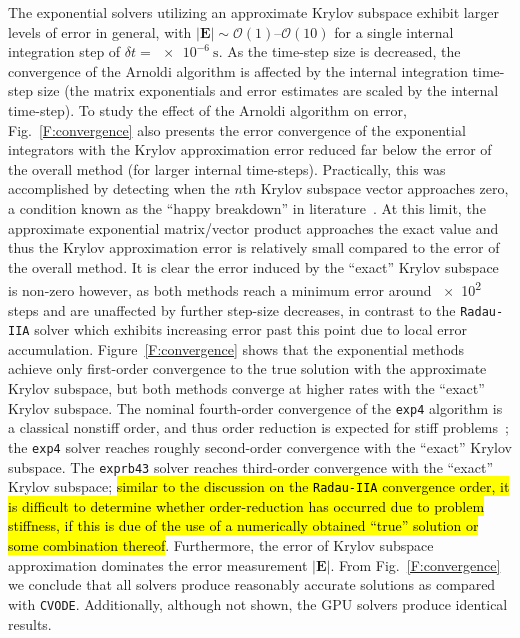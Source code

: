 \documentclass[preprint,review,11pt]{elsarticle}
\DeclareRobustCommand{\hlb}[1]{\sethlcolor{SkyBlue}\hl{#1}}
\begin{document}
The exponential solvers utilizing an approximate Krylov subspace exhibit larger levels of error in general, with $\left\lvert\textbf{E}\right\rvert \sim \mathcal{O}(1)\text{--}\mathcal{O}(10)$ for a single internal integration step of $\delta t = \SI{e-6}{\second}$.
As the time-step size is decreased, the convergence of the Arnoldi algorithm is affected by the internal integration time-step size (the matrix exponentials and error estimates are scaled by the internal time-step).
To study the effect of the Arnoldi algorithm on error, Fig.~\ref{F:convergence} also presents the error convergence of the exponential integrators with the Krylov approximation error reduced far below the error of the overall method (for larger internal time-steps).
Practically, this was accomplished by detecting when the $n$th Krylov subspace vector approaches zero, a condition known as the ``happy breakdown'' in literature~\cite{datta2010numerical}.
At this limit, the approximate exponential matrix\slash vector product approaches the exact value and thus the Krylov approximation error is relatively small compared to the error of the overall method.
It is clear the error induced by the ``exact'' Krylov subspace is non-zero however, as both methods reach a minimum error around \num{e2} steps and are unaffected by further step-size decreases, in contrast to the \texttt{Radau-IIA} solver which exhibits increasing error past this point due to local error accumulation.
Figure~\ref{F:convergence} shows that the exponential methods achieve only first-order convergence to the true solution with the approximate Krylov subspace, but both methods converge at higher rates with the ``exact'' Krylov subspace.
The nominal fourth-order convergence of the \texttt{exp4} algorithm is a classical nonstiff order, and thus order reduction is expected for stiff problems~\cite{ANU:7701740,Bisetti:2012jw}; the \texttt{exp4} solver reaches roughly second-order convergence with the ``exact'' Krylov subspace.
The \texttt{exprb43} solver reaches third-order convergence with the ``exact'' Krylov subspace; \hlb{similar to the discussion on the {\texttt{Radau-IIA}} convergence order, it is difficult to determine whether order-reduction has occurred due to problem stiffness, if this is due of the use of a numerically obtained ``true'' solution or some combination thereof}.
Furthermore, the error of Krylov subspace approximation dominates the error measurement $\lvert\textbf{E}\rvert$.
From Fig.~\ref{F:convergence} we conclude that all solvers produce reasonably accurate solutions as compared with \texttt{CVODE}.
Additionally, although not shown, the GPU solvers produce identical results.
\end{document}

